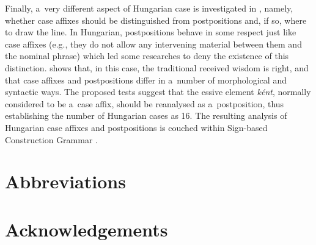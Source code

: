 \documentclass[output=paper]{langsci/langscibook}
\begin{document}
Finally, a~very different aspect of Hungarian case is investigated in \citealt{thui:11}, namely, whether case affixes should be distinguished from postpositions and, if so, where to draw the line.  In Hungarian, postpositions behave in some respect just like case affixes (e.g., they do not allow any intervening material between them and the nominal phrase) which led some researches to deny the existence of this distinction.  \citealt{thui:11} shows that, in this case, the traditional received wisdom is right, and that case affixes and postpositions differ in a~number of morphological and syntactic ways.  The proposed tests suggest that the essive element \emph{k{\'e}nt}, normally considered to be a~case affix, should be reanalysed as a~postposition, thus establishing the number of Hungarian cases as 16.  The resulting analysis of Hungarian case affixes and postpositions is couched within Sign-based Construction Grammar \citep{BS2012a-ed}.








{\sloppy 
\printbibliography[heading=subbibliography,notkeyword=this] 
}

 
\section*{Abbreviations}
\section*{Acknowledgements}

\printbibliography[heading=subbibliography,notkeyword=this] 
\end{document}

